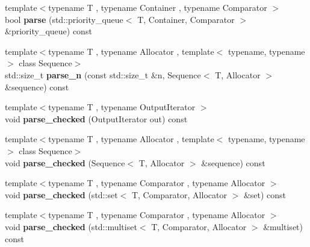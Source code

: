 \begin{DoxyCompactItemize}
\item 
\hypertarget{classstrtk_1_1token__grid_1_1row__type_af0ebd30be086f9074e67e71edf6af22c}{{\footnotesize template$<$typename T , typename Container , typename Comparator $>$ }\\bool {\bfseries parse} (std\-::priority\-\_\-queue$<$ T, Container, Comparator $>$ \&priority\-\_\-queue) const }\label{classstrtk_1_1token__grid_1_1row__type_af0ebd30be086f9074e67e71edf6af22c}

\item 
\hypertarget{classstrtk_1_1token__grid_1_1row__type_a371b4054dcd97afa2dc1c4c4547e0782}{{\footnotesize template$<$typename T , typename Allocator , template$<$ typename, typename $>$ class Sequence$>$ }\\std\-::size\-\_\-t {\bfseries parse\-\_\-n} (const std\-::size\-\_\-t \&n, Sequence$<$ T, Allocator $>$ \&sequence) const }\label{classstrtk_1_1token__grid_1_1row__type_a371b4054dcd97afa2dc1c4c4547e0782}

\item 
\hypertarget{classstrtk_1_1token__grid_1_1row__type_a6876426169962abe1b3470cbc55f90d1}{{\footnotesize template$<$typename T , typename Output\-Iterator $>$ }\\void {\bfseries parse\-\_\-checked} (Output\-Iterator out) const }\label{classstrtk_1_1token__grid_1_1row__type_a6876426169962abe1b3470cbc55f90d1}

\item 
\hypertarget{classstrtk_1_1token__grid_1_1row__type_a6bba12bd16d6b135d336d21df124b92b}{{\footnotesize template$<$typename T , typename Allocator , template$<$ typename, typename $>$ class Sequence$>$ }\\void {\bfseries parse\-\_\-checked} (Sequence$<$ T, Allocator $>$ \&sequence) const }\label{classstrtk_1_1token__grid_1_1row__type_a6bba12bd16d6b135d336d21df124b92b}

\item 
\hypertarget{classstrtk_1_1token__grid_1_1row__type_a63eae9f84a1c60cdd40e39e63bdacc12}{{\footnotesize template$<$typename T , typename Comparator , typename Allocator $>$ }\\void {\bfseries parse\-\_\-checked} (std\-::set$<$ T, Comparator, Allocator $>$ \&set) const }\label{classstrtk_1_1token__grid_1_1row__type_a63eae9f84a1c60cdd40e39e63bdacc12}

\item 
\hypertarget{classstrtk_1_1token__grid_1_1row__type_aa3ab26ddfd424ae123d7e8dfdbf62e62}{{\footnotesize template$<$typename T , typename Comparator , typename Allocator $>$ }\\void {\bfseries parse\-\_\-checked} (std\-::multiset$<$ T, Comparator, Allocator $>$ \&multiset) const }\label{classstrtk_1_1token__grid_1_1row__type_aa3ab26ddfd424ae123d7e8dfdbf62e62}


\end{DoxyCompactItemize}

